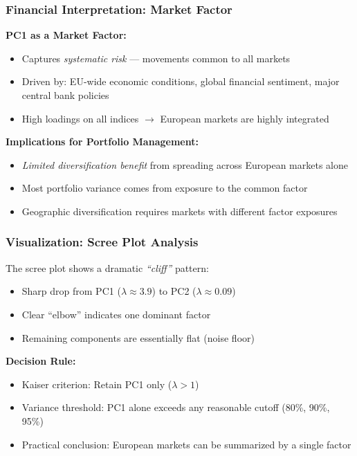 \documentclass[aspectratio=169]{beamer}
\begin{document}
\begin{frame}
    \frametitle{Financial Interpretation: Market Factor}
    \textbf{PC1 as a Market Factor:}
    \begin{itemize}
        \item Captures \textit{systematic risk} — movements common to all markets \pause
        \item Driven by: EU-wide economic conditions, global financial sentiment, major central bank policies \pause
        \item High loadings on all indices $\rightarrow$ European markets are highly integrated \pause
    \end{itemize}
    \vspace{12pt}
    \textbf{Implications for Portfolio Management:}
    \begin{itemize}
        \item \textit{Limited diversification benefit} from spreading across European markets alone \pause
        \item Most portfolio variance comes from exposure to the common factor \pause
        \item Geographic diversification requires markets with different factor exposures \pause
    \end{itemize}
\end{frame}

\begin{frame}
    \frametitle{Visualization: Scree Plot Analysis}
    The scree plot shows a dramatic \textit{``cliff''} pattern:
    \begin{itemize}
        \item Sharp drop from PC1 ($\lambda \approx 3.9$) to PC2 ($\lambda \approx 0.09$) \pause
        \item Clear ``elbow'' indicates one dominant factor \pause
        \item Remaining components are essentially flat (noise floor) \pause
    \end{itemize}
    \vspace{12pt}
    \textbf{Decision Rule:}
    \begin{itemize}
        \item Kaiser criterion: Retain PC1 only ($\lambda > 1$) \pause
        \item Variance threshold: PC1 alone exceeds any reasonable cutoff (80\%, 90\%, 95\%) \pause
        \item Practical conclusion: European markets can be summarized by a single factor \pause
    \end{itemize}
\end{frame}
\end{document}

